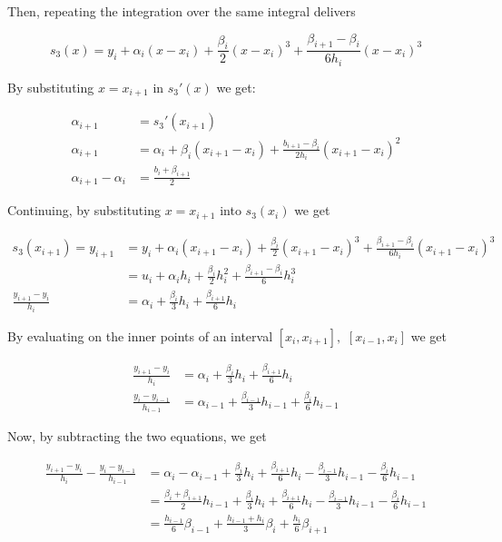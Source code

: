 Then, repeating the integration over the same integral delivers 

\[
    s_3(x) = y_i + \alpha_i (x - x_i) + \frac{\beta_i}{2} (x - x_i)^3 + \frac{\beta_{i + 1} - \beta_i}{6h_i}(x - x_i)^3
\]

By substituting \(x = x_{i + 1}\) in \(s_3'(x)\) we get: 

\begin{align*}
    \alpha_{i + 1} &= s_3'(x_{i + 1}) \\ 
    \alpha_{i + 1} &= \alpha_i + \beta_i (x_{i + 1} - x_i) + \frac{b_{i + 1} - \beta_i}{2h_i} (x_{i + 1} - x_i)^2 \\
    \alpha_{i + 1} - \alpha_i &=  \frac{b_i + \beta_{i + 1}}{2}
\end{align*}

Continuing, by substituting \(x = x_{i + 1}\) into \(s_3(x_i)\) we get 

\begin{align*}
    s_3(x_{i + 1}) = y_{i +1} &= y_i + \alpha_i (x_{i + 1} - x_i) + \frac{\beta_i}{2} (x_{i + 1} - x_i)^3 + \frac{\beta_{i + 1} - \beta_i}{6h_i}(x_{i + 1} - x_i)^3\\
    &= u_i + \alpha_i h_i + \frac{\beta_i}{2} h_i^2 + \frac{\beta_{i + 1} - \beta_{i}}{6} h_i^3 \\
    \frac{y_{i + 1} - y_i}{h_i} &= \alpha_i + \frac{\beta_i}{3} h_i + \frac{\beta_{i + 1}}{6} h_i
\end{align*}

By evaluating on the inner points of an interval \([x_i, x_{i + 1}],\) \([x_{i - 1}, x_i]\) we get 

\begin{align*}
    \frac{y_{i + 1} - y_i}{h_i} &= \alpha_i + \frac{\beta_i}{3} h_i + \frac{\beta_{i + 1}}{6} h_i \\ 
    \frac{y_{i} - y_{i - 1}}{h_{i - 1}} &= \alpha_{i - 1} + \frac{\beta_{i - 1}}{3} h_{i - 1} + \frac{\beta_{i}}{6} h_{i - 1}
\end{align*}

Now, by subtracting the two equations, we get

\begin{align*}
     \frac{y_{i + 1} - y_i}{h_i} - \frac{y_{i} - y_{i - 1}}{h_{i - 1}} &= \alpha_i - \alpha_{i - 1} + \frac{\beta_i}{3} h_i + \frac{\beta_{i + 1}}{6} h_i - \frac{\beta_{i - 1}}{3} h_{i - 1} - \frac{\beta_{i}}{6} h_{i - 1} \\ 
     &= \frac{\beta_i + \beta_{i + 1}}{2} h_{i - 1} + \frac{\beta_i}{3}h_i + \frac{\beta_{i + 1}}{6}h_i - \frac{\beta_{i  -1}}{3}h_{i - 1} - \frac{\beta_i}{6}h_{i - 1} \\
     &= \frac{h_{i - 1}}{6}\beta_{i -1} + \frac{h_{i - 1} + h_i}{3}\beta_i + \frac{h_i}{6} \beta_{i + 1}
\end{align*}

